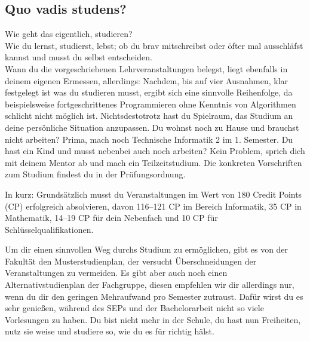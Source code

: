 \subsection{Quo vadis studens?}

Wie geht das eigentlich, studieren?\\
Wie du lernst, studierst, lebst; ob du brav mitschreibst oder öfter mal ausschläfst kannst und musst du selbst entscheiden. \\
Wann du die vorgeschriebenen Lehrveranstaltungen belegst, liegt ebenfalls in deinem eigenen Ermessen, allerdings: Nachdem, bis auf vier Ausnahmen, klar festgelegt ist was du studieren musst, ergibt sich eine sinnvolle Reihenfolge, da beispielsweise fortgeschrittenes Programmieren ohne Kenntnis von Algorithmen schlicht nicht möglich ist. Nichtsdestotrotz hast du Spielraum, das Studium an deine persönliche Situation anzupassen.
Du wohnst noch zu Hause und brauchst nicht arbeiten? Prima, mach noch Technische Informatik 2 im 1. Semester. Du hast ein Kind und musst nebenbei auch noch arbeiten? Kein Problem, sprich dich mit deinem Mentor ab und mach ein Teilzeitstudium. Die konkreten Vorschriften zum Studium findest du in der Prüfungsordnung.

In kurz: Grundsätzlich musst du Veranstaltungen im Wert von 180 Credit Points (CP) erfolgreich absolvieren, davon 116–121 CP im Bereich Informatik, 35 CP in Mathematik, 14–19 CP für dein Nebenfach und 10 CP für Schlüsselqualifikationen.

Um dir einen sinnvollen Weg durchs Studium zu ermöglichen, gibt es von der Fakultät den Musterstudienplan, der versucht Überschneidungen der Veranstaltungen zu vermeiden. Es gibt aber auch noch einen Alternativstudienplan der Fachgruppe, diesen empfehlen wir dir allerdings nur, wenn du dir den geringen Mehraufwand pro Semester zutraust. Dafür wirst du es sehr genießen, während des SEPs und der Bachelorarbeit nicht so viele Vorlesungen zu haben. 
Du bist  nicht mehr in der Schule, du  hast nun Freiheiten, nutz sie
weise und studiere so, wie du es für richtig hälst. 

	
